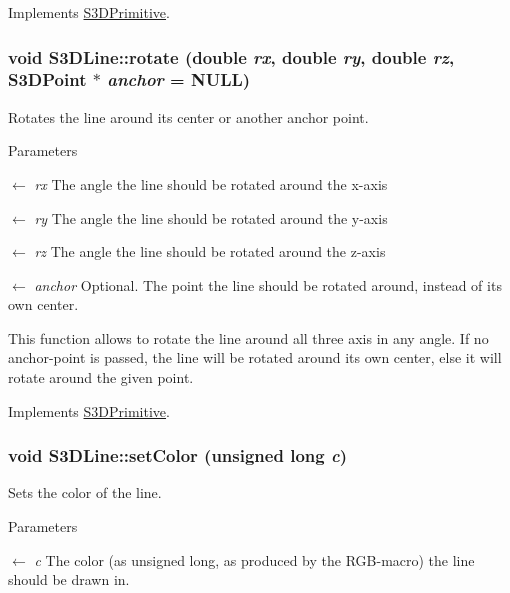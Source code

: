 Implements \hyperlink{class_s3_d_primitive_a73a178ec2e1aa8e95f01baf0552724a9}{S3DPrimitive}.

\hypertarget{class_s3_d_line_a4d23495df2c8f45855d8b80d30b01d30}{
\subsubsection[{rotate}]{\setlength{\rightskip}{0pt plus 5cm}void S3DLine::rotate (double {\em rx}, \/  double {\em ry}, \/  double {\em rz}, \/  {\bf S3DPoint} $\ast$ {\em anchor} = {\ttfamily NULL})}}
\label{class_s3_d_line_a4d23495df2c8f45855d8b80d30b01d30}


Rotates the line around its center or another anchor point. 


\begin{DoxyParams}{Parameters}
\item[\mbox{$\leftarrow$} {\em rx}]The angle the line should be rotated around the x-\/axis \item[\mbox{$\leftarrow$} {\em ry}]The angle the line should be rotated around the y-\/axis \item[\mbox{$\leftarrow$} {\em rz}]The angle the line should be rotated around the z-\/axis \item[\mbox{$\leftarrow$} {\em anchor}]Optional. The point the line should be rotated around, instead of its own center.\end{DoxyParams}
This function allows to rotate the line around all three axis in any angle. If no anchor-\/point is passed, the line will be rotated around its own center, else it will rotate around the given point. 

Implements \hyperlink{class_s3_d_primitive_a23eb36b6bd48643e8f7be4b950592d9e}{S3DPrimitive}.

\hypertarget{class_s3_d_line_a9feaf056477e858a7b0248a7b5cdd222}{
\subsubsection[{setColor}]{\setlength{\rightskip}{0pt plus 5cm}void S3DLine::setColor (unsigned long {\em c})}}
\label{class_s3_d_line_a9feaf056477e858a7b0248a7b5cdd222}


Sets the color of the line. 


\begin{DoxyParams}{Parameters}
\item[\mbox{$\leftarrow$} {\em c}]The color (as unsigned long, as produced by the RGB-\/macro) the line should be drawn in. \end{DoxyParams}


